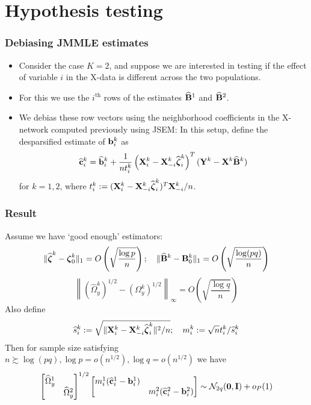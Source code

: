 \documentclass[10pt]{beamer}
\theoremstyle{definition}
\begin{document}
\section{Hypothesis testing}
\begin{frame}
\frametitle{Debiasing JMMLE estimates}

\begin{itemize}
\item Consider the case $K=2$, and suppose we are interested in testing if the effect of variable $i$ in the X-data is different across the two populations.
\vspace{1em}

\item For this we use the $i^{\text{th}}$ rows of the estimates $\widehat {{\mathbf{B}}}^1$ and $\widehat {{\mathbf{B}}}^2$.
\vspace{1em}

\item We debias these row vectors using the neighborhood coefficients in the X-network computed previously using JSEM:
%
In this setup, define the desparsified estimate of ${\bf{b}}_i^k$ as
%
\begin{align*}
\widehat {{\bf{c}}}_i^k = \widehat {{\bf{b}}}_i^k + \frac{1}{n t_i^k} \left( {\mathbf{X}}_i^k - {\mathbf{X}}_{-i}^k \widehat {{\boldsymbol{\zeta}}}_i^k \right)^T
({\mathbf{Y}}^k - {\mathbf{X}}^k \widehat {{\mathbf{B}}}^k )
\end{align*}
%
for $k = 1,2$, where $t_i^k := ( {\mathbf{X}}_i^k - {\mathbf{X}}_{-i}^k \widehat {{\boldsymbol{\zeta}}}_i^k )^T {\mathbf{X}}_{-i}^k/n$.
\end{itemize}

\end{frame}

\begin{frame}
\frametitle{Result}
Assume we have `good enough' estimators:
%
\[
\| \widehat {{\boldsymbol{\zeta}}}^k - {\boldsymbol{\zeta}}_0^k \|_1 = O \left( \sqrt { \frac{\log p}{n}} \right); \quad
\| \widehat {{\mathbf{B}}}^k - {\mathbf{B}}^k_0 \|_1 = O \left( \sqrt{\frac{\log (pq)}{n}} \right)
\]
\[
\left\| (\widehat \Omega_y^k)^{1/2} - (\Omega_y^k)^{1/2} \right\|_\infty = O \left( \sqrt { \frac{\log q}{n}} \right)
\]
%
Also define
%
\[
\widehat s_i^k := \sqrt{\| {\mathbf{X}}_i^k - {\mathbf{X}}_{-i}^k \widehat {{\boldsymbol{\zeta}}}_i^k \|^2/n}; \quad
m_i^k := \sqrt n t_i^k / \widehat s_i^k
\]
%
Then for sample size satisfying $n \succsim \log (pq), \log p = o(n^{1/2}), \log q = o(n^{1/2})$ we have
%
\begin{align*}
\begin{bmatrix}
\widehat \Omega_y^1 &\\
& \widehat \Omega_y^2
\end{bmatrix}^{1/2}
%
\begin{bmatrix}
m_i^1 (\widehat \bfc_i^1 - \bfb_i^1) &\\
&  m_i^2 (\widehat \bfc_i^2 - \bfb_i^2)
\end{bmatrix}
\sim \cN_{2q} ({\bf 0}, \bfI) + o_P(1)
\end{align*}

\end{frame}
\end{document}
